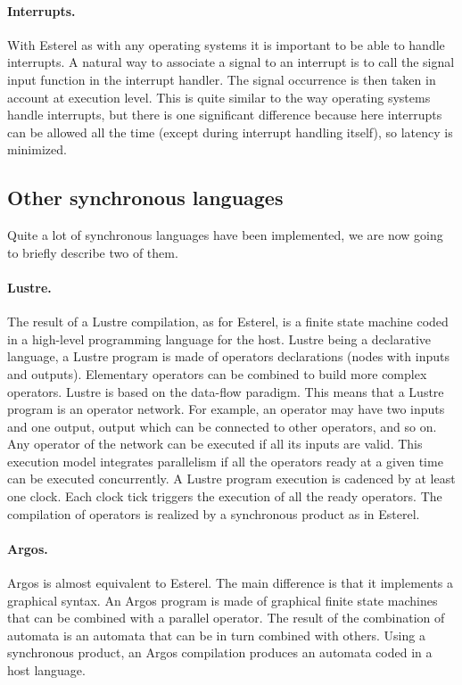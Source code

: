 \documentclass[10pt]{report}
\begin{document}
\paragraph{Interrupts.}  With Esterel as with any operating systems it is important to be able to handle interrupts. A natural way to associate 
a signal to an interrupt is to call the signal input function in the interrupt handler. The signal occurrence is then
taken in account at execution level. This is quite similar to the way operating systems handle interrupts, but there is one
significant difference because here interrupts can be allowed all the time (except during interrupt handling itself), so latency
is minimized.

\subsection{Other synchronous languages}

Quite a lot of synchronous languages have been implemented, we are now going to briefly describe two of them.

\paragraph{Lustre.} The result of a Lustre compilation, as for Esterel, is a finite state machine coded in a high-level programming language 
for the host. Lustre being a declarative language, a Lustre program is made of operators declarations (nodes with inputs
and outputs). Elementary operators can be combined to build more complex operators. Lustre is based on the data-flow paradigm. This means
that a Lustre program is an operator network. For example, an operator may have two inputs and one output, output which can be connected
to other operators, and so on. Any operator of the network can be executed if all its inputs are valid. This execution model
integrates parallelism if all the operators ready at a given time can be executed concurrently. A Lustre program execution is cadenced by 
at least one clock. Each clock tick triggers the execution of all the ready operators. The compilation of operators is realized by a synchronous
product as in Esterel.

\paragraph{Argos.} Argos is almost equivalent to Esterel. The main difference is that it implements a graphical syntax. An
Argos program is made of graphical finite state machines that can be combined with a parallel operator. The result of the combination 
of automata is an automata that can be in turn combined with others. Using a synchronous product, an Argos compilation produces an automata coded 
in a host language.
\end{document}
